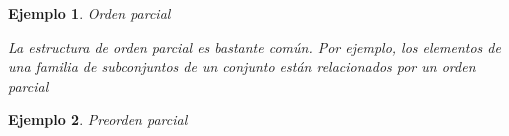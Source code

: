 \documentclass[a5paper,doc,10pt,noapacite]{apa6}
\newtheorem{ejem}{Ejemplo}
\begin{document}
{{\begin{ejem} Orden parcial

\begin{figure}[H]
\begin{floatrow}
	\fontsize{7}{11}\selectfont
	\captionsetup{justification=centering, labelfont=footnotesize, font=footnotesize}
\end{floatrow}
\end{figure}

\vspace{-2\baselineskip}
La estructura de orden parcial es bastante común. Por ejemplo, los elementos de una familia de subconjuntos de un conjunto están relacionados por un orden parcial

\end{ejem}

\newpage

\begin{ejem} Preorden parcial


\end{ejem}}}
\end{document}
